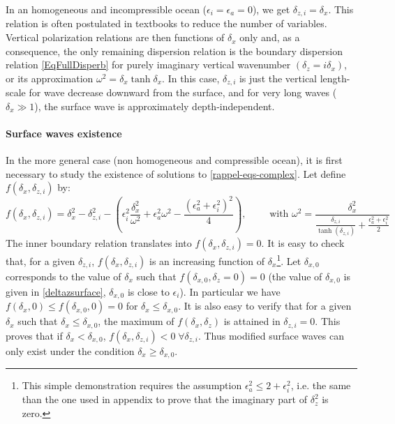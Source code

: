 In an homogeneous and incompressible ocean ($\epsilon_i=\epsilon_a=0$), we get $\delta_{z,i}=\delta_x$. This relation is often postulated in textbooks to reduce the number of variables. Vertical polarization relations are then functions of $\delta_x$ only \citep{gill_1982} and, as a consequence, the only remaining dispersion relation is the boundary dispersion relation \ref{EqFullDisperb} for purely imaginary vertical wavenumber $(\delta_z=i\delta_x)$, or its approximation  $\omega^2=\delta_x \tanh \delta_x$. In this case, $\delta_{z,i}$ is just the vertical length-scale for wave decrease downward from the surface, and for very long waves ($\delta_x \gg 1$), the surface wave is approximately depth-independent.
%
\paragraph{Surface waves existence} In the more general case (non homogeneous and compressible ocean), it is first necessary to study the existence of solutions to \ref{rappel-eqs-complex}. Let define
$f(\delta_x, \delta_{z,i})$ by:
\[
f(\delta_x, \delta_{z,i})=\delta_x^2-\delta_{z,i}^2-\left(
\epsilon_i^2\frac{\delta_x^2}
{\omega^2}+\epsilon_a^2\omega^2-\frac{(\epsilon_a^2+\epsilon_i^2)^2}{4}
\right),
\qquad \mbox{ with }\omega^2=\frac{\delta_x^2}
{\frac{\delta_{z,i}}{\tanh(\delta_{z,i})}+\frac{\epsilon_a^2+\epsilon_i^2}{2}}
\]
The inner boundary relation translates into $f(\delta_x,\delta_{z,i})=0$. It is easy to check that, for a given $\delta_{z,i}$, $f(\delta_x,\delta_{z,i})$ is an increasing function of $\delta_x$\footnote{This simple demonstration requires the assumption $\epsilon_a^2 \le 2 + \epsilon_i^2$, i.e. the same than the one used in appendix to prove that the imaginary part of $\delta_z^2$ is zero.}. Let $\delta_{x,0}$ corresponds to the value of $\delta_x$ such that $f(\delta_{x,0},\delta_z=0)=0$ (the value of $\delta_{x,0}$ is given in \ref{deltazsurface}, $\delta_{x,0}$ is close to $\epsilon_i$).
In particular we have $f(\delta_x,0)\le f(\delta_{x,0},0)=0$ for $\delta_x \le \delta_{x,0}$. It is also easy to verify that for a given $\delta_x$ such that $\delta_x \le \delta_{x,0}$, the maximum of $f(\delta_x,\delta_z)$ is attained in $\delta_{z,i}=0$. This proves that if $\delta_x < \delta_{x,0}$, $f(\delta_x,\delta_{z,i}) < 0\; \forall \delta_{z,i}$. Thus modified surface waves can only exist under the condition $\delta_x \ge \delta_{x,0}$.
%
